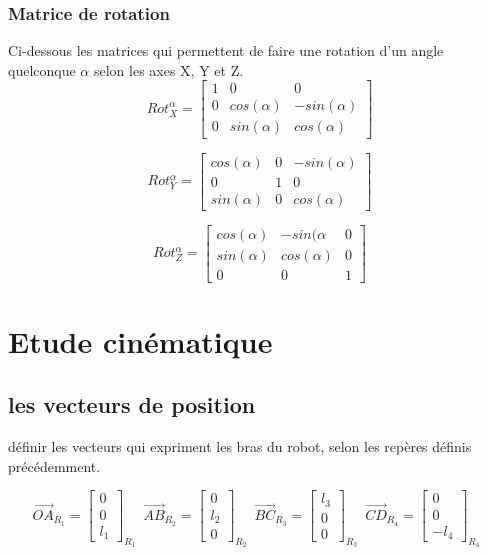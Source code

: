 \documentclass[12pt,a4paper]{article}
\begin{document}
\subsubsection{Matrice de rotation}
Ci-dessous les matrices qui permettent de faire une rotation d'un angle quelconque $\alpha$ selon les axes X, Y et Z. 
\begin{equation}
Rot_X^{\alpha}=
\begin{bmatrix}
1 & 0 & 0\\
0 & cos(\alpha) & -sin(\alpha)\\
0 & sin(\alpha) & cos(\alpha)
\end{bmatrix}
\end{equation}

\begin{equation}
Rot_Y^{\alpha}=
\begin{bmatrix}
cos(\alpha) & 0 & -sin(\alpha)\\
0 & 1 & 0\\
sin(\alpha) & 0 & cos(\alpha)
\end{bmatrix}
\end{equation}

\begin{equation}
Rot_Z^{\alpha}=
\begin{bmatrix}
cos(\alpha) & -sin(\alpha & 0\\
sin(\alpha) & cos(\alpha) & 0\\
0 & 0 & 1
\end{bmatrix}
\end{equation}
\newpage
\section{Etude cinématique}


\subsection{les vecteurs de position}

définir les vecteurs qui expriment les bras du robot, selon les repères définis précédemment. 

\begin{equation}
\vec{OA}_{R_{1}}=
\begin{bmatrix}
0 \\
0\\
l_1
\end{bmatrix}_{R_{1}} \enspace
\vec{AB}_{R_{2}}=
\begin{bmatrix}
0 \\
l_2\\
0
\end{bmatrix}_{R_{2}} \enspace
\vec{BC}_{R_{3}}=
\begin{bmatrix}
l_3 \\
0\\
0
\end{bmatrix}_{R_{3}} \enspace
\vec{CD}_{R_{4}}=
\begin{bmatrix}
0 \\
0\\
-l_4
\end{bmatrix}_{R_{4}} \enspace
\end{equation}
\end{document}
